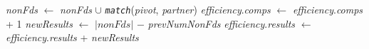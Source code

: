 \begin{algorithm}[t]
{{			\textit{nonFds} $\gets$ \textit{nonFds} $\cup$ \textit{\texttt{match}}(\textit{pivot}, \textit{partner})\; \label{alg:sampling:match}
			\textit{efficiency}.\textit{comps} $\gets$ \textit{efficiency}.\textit{comps} + 1\;
		}
	}
	\textit{newResults} $\gets$ $\left|\textit{nonFds}\right|$ $-$ \textit{prevNumNonFds}\;
	\textit{efficiency}.\textit{results} $\gets$ \textit{efficiency}.\textit{results} + \textit{newResults}\; \label{alg:sampling:runwindowend}
\end{algorithm}

\clearpage

